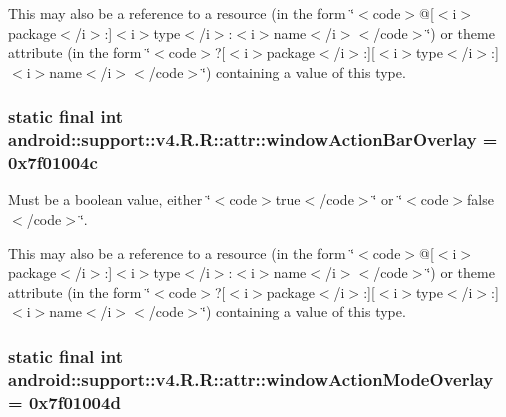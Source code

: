 This may also be a reference to a resource (in the form \char`\"{}$<$code$>$@\mbox{[}$<$i$>$package$<$/i$>$:\mbox{]}$<$i$>$type$<$/i$>$:$<$i$>$name$<$/i$>$$<$/code$>$\char`\"{}) or theme attribute (in the form \char`\"{}$<$code$>$?\mbox{[}$<$i$>$package$<$/i$>$:\mbox{]}\mbox{[}$<$i$>$type$<$/i$>$:\mbox{]}$<$i$>$name$<$/i$>$$<$/code$>$\char`\"{}) containing a value of this type. \hypertarget{classandroid_1_1support_1_1v4_1_1_r_1_1attr_8872448943079550605a1d24f4d5a0ac}{
\subsubsection[{windowActionBarOverlay}]{\setlength{\rightskip}{0pt plus 5cm}static final int android::support::v4.R.R::attr::windowActionBarOverlay = 0x7f01004c}}
\label{classandroid_1_1support_1_1v4_1_1_r_1_1attr_8872448943079550605a1d24f4d5a0ac}


Must be a boolean value, either \char`\"{}$<$code$>$true$<$/code$>$\char`\"{} or \char`\"{}$<$code$>$false$<$/code$>$\char`\"{}. 

This may also be a reference to a resource (in the form \char`\"{}$<$code$>$@\mbox{[}$<$i$>$package$<$/i$>$:\mbox{]}$<$i$>$type$<$/i$>$:$<$i$>$name$<$/i$>$$<$/code$>$\char`\"{}) or theme attribute (in the form \char`\"{}$<$code$>$?\mbox{[}$<$i$>$package$<$/i$>$:\mbox{]}\mbox{[}$<$i$>$type$<$/i$>$:\mbox{]}$<$i$>$name$<$/i$>$$<$/code$>$\char`\"{}) containing a value of this type. \hypertarget{classandroid_1_1support_1_1v4_1_1_r_1_1attr_2967f23da698b29669ce8231d75639e5}{
\subsubsection[{windowActionModeOverlay}]{\setlength{\rightskip}{0pt plus 5cm}static final int android::support::v4.R.R::attr::windowActionModeOverlay = 0x7f01004d}}
\label{classandroid_1_1support_1_1v4_1_1_r_1_1attr_2967f23da698b29669ce8231d75639e5}


